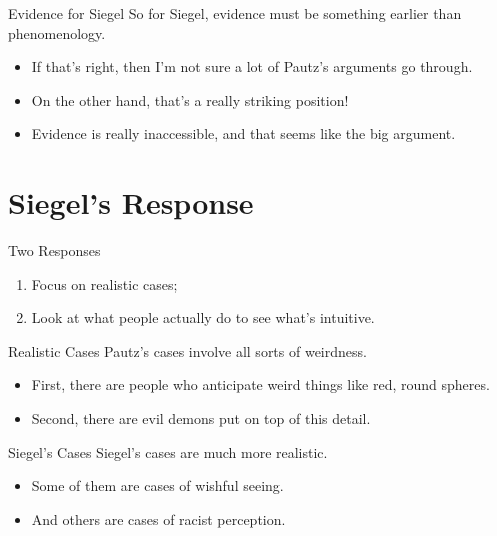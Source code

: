 \documentclass[
  17pt,
  letterpaper,
  ignorenonframetext,
  aspectratio=169,
  xcolor={dvipsnames}]{beamer}
\providecommand{\tightlist}{%
  \setlength{\itemsep}{0pt}\setlength{\parskip}{0pt}}\usepackage{longtable,booktabs,array}
\begin{document}
\begin{frame}{Evidence for Siegel}
\protect\hypertarget{evidence-for-siegel-1}{}
So for Siegel, evidence must be something earlier than phenomenology.

\begin{itemize}[<+->]
\tightlist
\item
  If that's right, then I'm not sure a lot of Pautz's arguments go
  through.
\item
  On the other hand, that's a really striking position!
\item
  Evidence is really inaccessible, and that seems like the big argument.
\end{itemize}
\end{frame}

\hypertarget{siegels-response}{%
\section{Siegel's Response}\label{siegels-response}}

\begin{frame}{Two Responses}
\protect\hypertarget{two-responses}{}
\begin{enumerate}[<+->]
\tightlist
\item
  Focus on realistic cases;
\item
  Look at what people actually do to see what's intuitive.
\end{enumerate}
\end{frame}

\begin{frame}{Realistic Cases}
\protect\hypertarget{realistic-cases}{}
Pautz's cases involve all sorts of weirdness.

\begin{itemize}[<+->]
\tightlist
\item
  First, there are people who anticipate weird things like red, round
  spheres.
\item
  Second, there are evil demons put on top of this detail.
\end{itemize}
\end{frame}

\begin{frame}{Siegel's Cases}
\protect\hypertarget{siegels-cases}{}
Siegel's cases are much more realistic.

\begin{itemize}[<+->]
\tightlist
\item
  Some of them are cases of wishful seeing.
\item
  And others are cases of racist perception.
\end{itemize}
\end{frame}
\end{document}
